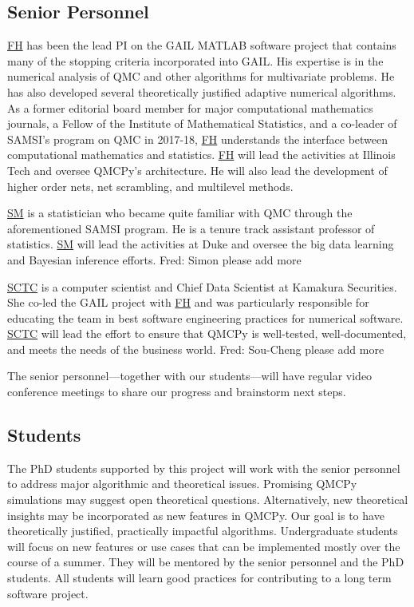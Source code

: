 \documentclass[11pt]{NSFamsart}
\newcommand{\FH}{\hyperlink{FHlink}{FH}\xspace}
\newcommand{\SM}{\hyperlink{SMlink}{SM}\xspace}
\newcommand{\SCTC}{\hyperlink{SCTClink}{SCTC}\xspace}
\newcommand{\FJHNote}[1]{{\color{blue}Fred: #1}}
\begin{document}
\subsection{Senior Personnel}
\FH has been the lead PI on the GAIL \cite{ChoEtal20a} MATLAB software project that contains many of the stopping criteria incorporated into GAIL.  His expertise is in the numerical analysis of QMC and other algorithms for multivariate problems.  He has also developed several theoretically justified adaptive numerical algorithms.  As a former editorial board member for major computational mathematics journals, a Fellow of the Institute of Mathematical Statistics, and a co-leader of SAMSI's program on QMC in 2017-18, \FH understands the interface between computational mathematics and statistics.  \FH will lead the activities at Illinois Tech and oversee QMCPy's architecture.  He will also lead the development of higher order nets, net scrambling, and multilevel methods.

\SM is a statistician who became quite familiar with QMC through the aforementioned SAMSI program.  He is a tenure track assistant professor of statistics.  \SM will lead the activities at Duke and oversee the big data learning and Bayesian inference efforts. \FJHNote{Simon please add more}

\SCTC is a computer scientist and Chief Data Scientist at Kamakura Securities.  She co-led the GAIL project with \FH and was particularly responsible for educating the team in best software engineering practices for numerical software.  \SCTC will lead the effort to ensure that QMCPy is well-tested, well-documented, and meets the needs of the business world.  \FJHNote{Sou-Cheng please add more}

The senior personnel---together with our students---will have regular video conference meetings to share our progress and brainstorm next steps.


\subsection{Students}  The PhD students supported by this project will work with the senior personnel to address major algorithmic and theoretical issues.  Promising QMCPy simulations may suggest open theoretical questions.  Alternatively, new theoretical insights may be incorporated as new features in QMCPy.  Our goal is to have theoretically justified, practically impactful algorithms.  Undergraduate students will focus on new features or use cases that can be implemented mostly over the course of a summer.  They will be mentored by the senior personnel and the PhD students.  All students will learn good practices for contributing to a long term software project.
\end{document}
